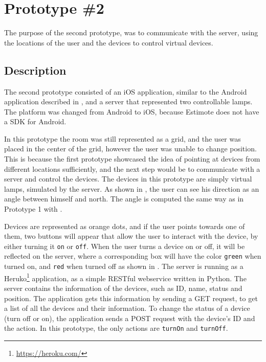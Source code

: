 \section{Prototype \#2}
\label{sec:implementation:prototypes:prototype2}
The purpose of the second prototype, 
was to communicate with the server, 
using the locations of the user and the devices to control virtual devices. 

\subsection{Description}
The second prototype consisted of an iOS application, 
similar to the Android application described in , 
and a server that represented two controllable lamps.
The platform was changed from Android to iOS, 
because Estimote does not have a SDK for Android.

In this prototype the room was still represented as a grid, 
and the user was placed in the center of the grid, 
however the user was unable to change position.
This is because the first prototype showcased the idea of pointing at devices from different locations sufficiently, 
and the next step would be to communicate with a server and control the devices. 
The devices in this prototype are simply virtual lamps, simulated by the server. 
As shown in , 
the user can see his direction as an angle between himself and north.
The angle is computed the same way as in Prototype 1 with .

Devices are represented as orange dots, 
and if the user points towards one of them, 
two buttons will appear that allow the user to interact with the device, 
by either turning it \texttt{on} or \texttt{off}.
When the user turns a device on or off, 
it will be reflected on the server, 
where a corresponding box will have the color \texttt{green} when turned on, 
and \texttt{red} when turned off as shown in .
The server is running as a Heruko\footnote{\url{https://heroku.com/}} application, 
as a simple RESTful webservice written in Python. 
The server contains the information of the devices, 
such as ID, name, status and position.
The application gets this information by sending a GET request, 
to get a list of all the devices and their information. 
To change the status of a device (turn off or on), 
the application sends a POST request with the device's ID and the action. 
In this prototype, the only actions are \texttt{turnOn} and \texttt{turnOff}.

